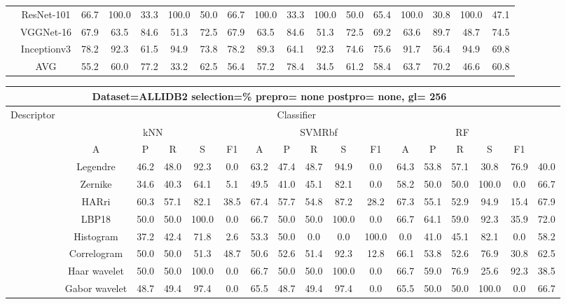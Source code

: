 \documentclass[12pt,italian]{article}
\begin{document}
\begin{tiny}
\begin{longtable}{lcccccccccccccccc}
& ResNet-101 & 66.7 & 100.0 & 33.3 & 100.0 & 50.0 & 66.7 & 100.0 & 33.3 & 100.0 & 50.0 & 65.4 & 100.0 & 30.8 & 100.0 & 47.1 \\ 
& VGGNet-16 & 67.9 & 63.5 & 84.6 & 51.3 & 72.5 & 67.9 & 63.5 & 84.6 & 51.3 & 72.5 & 69.2 & 63.6 & 89.7 & 48.7 & 74.5 \\ 
& Inceptionv3 & 78.2 & 92.3 & 61.5 & 94.9 & 73.8 & 78.2 & 89.3 & 64.1 & 92.3 & 74.6 & 75.6 & 91.7 & 56.4 & 94.9 & 69.8 \\ 
\hline
& AVG & 55.2 & 60.0 & 77.2 & 33.2 & 62.5 & 56.4 & 57.2 & 78.4 & 34.5 & 61.2 & 58.4 & 63.7 & 70.2 & 46.6 & 60.8 \\ 
\hline
\bottomrule
\end{longtable} 

 \pagebreak 
\begin{longtable}{lcccccccccccccccc}
\toprule
\multicolumn{16}{c}{Dataset=ALLIDB2 selection=\% prepro= none postpro= none, gl= 256} \\ 
\toprule
Descriptor & \multicolumn{15}{c}{Classifier} \\ 
& \multicolumn{5}{c}{kNN} & \multicolumn{5}{c}{SVMRbf} & \multicolumn{5}{c}{RF} \\ 
& A & P & R & S & F1 & A & P & R & S & F1 & A & P & R & S & F1 \\ 
\midrule
& Legendre & 46.2 & 48.0 & 92.3 &  0.0 & 63.2 & 47.4 & 48.7 & 94.9 &  0.0 & 64.3 & 53.8 & 57.1 & 30.8 & 76.9 & 40.0 \\ 
& Zernike & 34.6 & 40.3 & 64.1 &  5.1 & 49.5 & 41.0 & 45.1 & 82.1 &  0.0 & 58.2 & 50.0 & 50.0 & 100.0 &  0.0 & 66.7 \\ 
& HARri & 60.3 & 57.1 & 82.1 & 38.5 & 67.4 & 57.7 & 54.8 & 87.2 & 28.2 & 67.3 & 55.1 & 52.9 & 94.9 & 15.4 & 67.9 \\ 
& LBP18 & 50.0 & 50.0 & 100.0 &  0.0 & 66.7 & 50.0 & 50.0 & 100.0 &  0.0 & 66.7 & 64.1 & 59.0 & 92.3 & 35.9 & 72.0 \\ 
& Histogram & 37.2 & 42.4 & 71.8 &  2.6 & 53.3 & 50.0 &  0.0 &  0.0 & 100.0 &  0.0 & 41.0 & 45.1 & 82.1 &  0.0 & 58.2 \\ 
& Correlogram & 50.0 & 50.0 & 51.3 & 48.7 & 50.6 & 52.6 & 51.4 & 92.3 & 12.8 & 66.1 & 53.8 & 52.6 & 76.9 & 30.8 & 62.5 \\ 
& Haar wavelet & 50.0 & 50.0 & 100.0 &  0.0 & 66.7 & 50.0 & 50.0 & 100.0 &  0.0 & 66.7 & 59.0 & 76.9 & 25.6 & 92.3 & 38.5 \\ 
& Gabor wavelet & 48.7 & 49.4 & 97.4 &  0.0 & 65.5 & 48.7 & 49.4 & 97.4 &  0.0 & 65.5 & 50.0 & 50.0 & 100.0 &  0.0 & 66.7 \\ 

\end{longtable}
\end{tiny}
\end{document}
